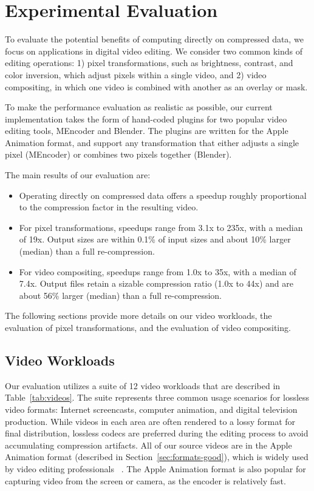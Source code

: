 \section{Experimental Evaluation}

To evaluate the potential benefits of computing directly on compressed
data, we focus on applications in digital video editing.  We consider
two common kinds of editing operations: 1) pixel transformations, such
as brightness, contrast, and color inversion, which adjust pixels
within a single video, and 2) video compositing, in which one video is
combined with another as an overlay or mask.

To make the performance evaluation as realistic as possible, our
current implementation takes the form of hand-coded plugins for two
popular video editing tools, MEncoder and Blender.  The plugins are
written for the Apple Animation format, and support any transformation
that either adjusts a single pixel (MEncoder) or combines two pixels
together (Blender).

The main results of our evaluation are:
\begin{itemize}

\item Operating directly on compressed data offers a speedup roughly
proportional to the compression factor in the resulting video.

\item For pixel transformations, speedups range from 3.1x to 235x,
with a median of 19x.  Output sizes are within 0.1\% of input sizes
and about 10\% larger (median) than a full re-compression.

\item For video compositing, speedups range from 1.0x to 35x, with a
median of 7.4x.  Output files retain a sizable compression ratio (1.0x
to 44x) and are about 56\% larger (median) than a full re-compression.

\end{itemize}
The following sections provide more details on our video workloads,
the evaluation of pixel transformations, and the evaluation of video
compositing.

\subsection{Video Workloads}

Our evaluation utilizes a suite of 12 video workloads that are
described in Table~\ref{tab:videos}.  The suite represents three
common usage scenarios for lossless video formats: Internet
screencasts, computer animation, and digital television production.
While videos in each area are often rendered to a lossy format for
final distribution, lossless codecs are preferred during the editing
process to avoid accumulating compression artifacts.  All of our
source videos are in the Apple Animation format (described in
Section~\ref{sec:formats-good}), which is widely used by video editing
professionals~\cite[p.~106]{adobe-anim} \cite[p.~284]{harrington-anim}
\cite[p.~367]{long-anim} \cite[p.~280]{pogue-anim}.  The Apple
Animation format is also popular for capturing video from the screen
or camera, as the encoder is relatively fast.

